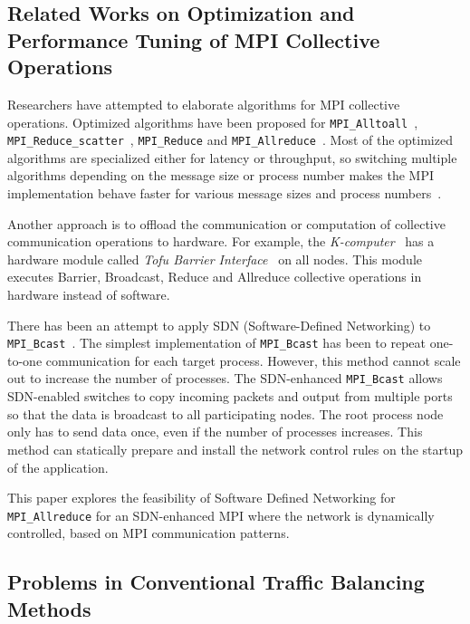 \hypertarget{related-works-on-optimization-and-performance-tuning-of-mpi-collective-operations}{%
\subsection{Related Works on Optimization and Performance Tuning of MPI
Collective
Operations}\label{related-works-on-optimization-and-performance-tuning-of-mpi-collective-operations}}

Researchers have attempted to elaborate algorithms for MPI collective
operations. Optimized algorithms have been proposed for
\texttt{MPI\_Alltoall}~\cite{Bruck1997},
\texttt{MPI\_Reduce\_scatter}~\cite{Iannello1997}, \texttt{MPI\_Reduce} and
\texttt{MPI\_Allreduce}~\cite{Rabenseifner1997}. Most of the optimized
algorithms are specialized either for latency or throughput, so switching
multiple algorithms depending on the message size or process number makes the
MPI implementation behave faster for various message sizes and process
numbers~\cite{Thakur2005}.

Another approach is to offload the communication or computation of
collective communication operations to hardware. For example, the
\emph{K-computer}~\cite{Yokokawa2011} has a hardware module called
\emph{Tofu Barrier Interface}~\cite{Ajima2012} on all nodes. This module
executes Barrier, Broadcast, Reduce and Allreduce collective operations
in hardware instead of software.

There has been an attempt to apply SDN (Software-Defined Networking) to
\texttt{MPI\_Bcast}~\cite{Dashdavaa2013}. The simplest implementation of
\texttt{MPI\_Bcast} has been to repeat one-to-one communication for each
target process. However, this method cannot scale out to increase the
number of processes. The SDN-enhanced \texttt{MPI\_Bcast} allows
SDN-enabled switches to copy incoming packets and output from multiple
ports so that the data is broadcast to all participating nodes. The root
process node only has to send data once, even if the number of processes
increases. This method can statically prepare and install the network
control rules on the startup of the application.

This paper explores the feasibility of Software Defined Networking for
\texttt{MPI\_Allreduce} for an SDN-enhanced MPI where the network is
dynamically controlled, based on MPI communication patterns.

\hypertarget{problems-in-conventional-traffic-balancing-methods}{%
\subsection{Problems in Conventional Traffic Balancing
Methods}\label{problems-in-conventional-traffic-balancing-methods}}

